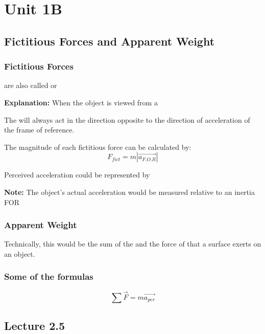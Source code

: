 \chapter{Unit 1B}

\section{Fictitious Forces and Apparent Weight}
\subsection{Fictitious Forces}
 are also called  or 

\begin{redblock}
    \textbf{Explanation:} When the object is viewed from a 
\end{redblock}

The  will always act in the direction opposite to the direction of acceleration of 
the frame of reference.\\

\begin{cyanblock}
    The magnitude of each fictitious force can be calculated by:
    \[
        F_{fict} = m|\vec{a_{F.O.R}}|
    \]
\end{cyanblock}

Perceived acceleration could be represented by 

\begin{redblock}
    \textbf{Note: } The object's actual acceleration would be measured relative to an inertia FOR
\end{redblock}

\subsection{Apparent Weight}
Technically, this would be the sum of the  and the force of  that a surface exerts 
on an object. 

\subsection{Some of the formulas}
\[
    \sum \vec{F} = m\vec{a_{per}}
\]

\section{Lecture 2.5}
